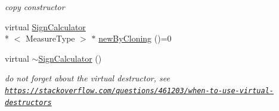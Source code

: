 \begin{DoxyCompactItemize}
\begin{DoxyCompactList}\small\item\em copy constructor \end{DoxyCompactList}\item 
virtual \hyperlink{class_ox_1_1_sign_calculator}{Sign\-Calculator}\\*
$<$ Measure\-Type $>$ $\ast$ \hyperlink{class_ox_1_1_sign_calculator_a40d9d97a505a69b687429bf545597687}{new\-By\-Cloning} ()=0
\item 
\hypertarget{class_ox_1_1_sign_calculator_a5143a172e360633d8df758756d146889}{virtual \hyperlink{class_ox_1_1_sign_calculator_a5143a172e360633d8df758756d146889}{$\sim$\-Sign\-Calculator} ()}\label{class_ox_1_1_sign_calculator_a5143a172e360633d8df758756d146889}

\begin{DoxyCompactList}\small\item\em do not forget about the virtual destructor, see \href{https://stackoverflow.com/questions/461203/when-to-use-virtual-destructors}{\tt https\-://stackoverflow.\-com/questions/461203/when-\/to-\/use-\/virtual-\/destructors} \end{DoxyCompactList}\end{DoxyCompactItemize}
